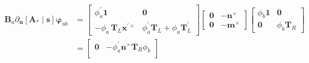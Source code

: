 \begin{equation*} 
   \begin{aligned}
   \bm{B}_a \partial_{\bm{u}} [\bm{A}_*\mid\bm{s}]\bm{\varphi}_{u b}
   &= \begin{bmatrix}
   \phi_a^\prime\mathbf{1} & \mathbf{0} \\
   -\phi_a \,\mathbf{T}_{\scriptscriptstyle{L}} \bm{x}^{\prime\times} & \phi_a^\prime \mathbf{T}_{\scriptscriptstyle{L}}+ \phi_a\mathbf{T}_{\scriptscriptstyle{L}}^{\prime}
   \end{bmatrix} \begin{bmatrix}
   \mathbf{0} & -\bm{n}^\times\\
   \mathbf{0} & -\bm{m}^\times
   \end{bmatrix}  \begin{bmatrix}
   \phi_b \mathbf{1} & \mathbf{0} \\
   \mathbf{0} & \phi_b \mathbf{T}_{\scriptscriptstyle{R}}
   \end{bmatrix} \\
    &=\begin{bmatrix}
    \mathbf{0} & -\phi_a^{\prime} \bm{n}^\times\mathbf{T}_{\scriptscriptstyle{R}} \phi_b\\

\end{bmatrix}
\end{aligned}
\end{equation*}
